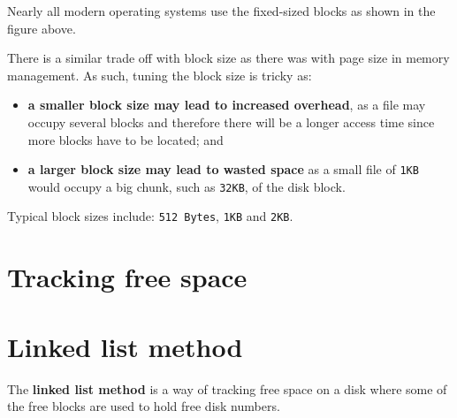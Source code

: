 \documentclass[a4paper]{systems-software}
\begin{document}
Nearly all modern operating systems use the fixed-sized blocks as shown in the figure above.

There is a similar trade off with block size as there was with page size in memory management. As such, tuning the block size is tricky as:
\begin{itemize}
	\item \textbf{a smaller block size may lead to increased overhead}, as a file may occupy several blocks and therefore there will be a longer access time since more blocks have to be located; and 
	\item \textbf{a larger block size may lead to wasted space} as a small file of \texttt{1KB} would occupy a big chunk, such as \texttt{32KB}, of the disk block.
\end{itemize}

Typical block sizes include: \texttt{512 Bytes}, \texttt{1KB} and \texttt{2KB}.


\newpage

\section{Tracking free space}

\section*{Linked list method}

The \textbf{linked list method} is a way of tracking free space on a disk where some of the free blocks are used to hold free disk numbers.
\end{document}
